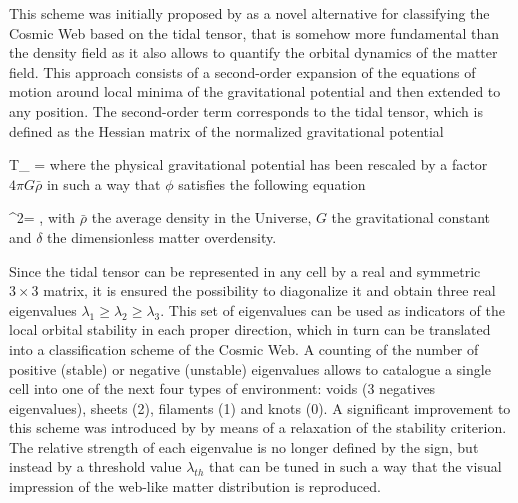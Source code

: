 \documentclass[a4,useAMS,usenatbib,usegraphicx]{latex/mn2e}
\begin{document}
This scheme was initially proposed by \citet{Hahn07} as a novel 
alternative for classifying the Cosmic Web based on the tidal tensor, 
that is somehow more fundamental than the density field as it also allows 
to quantify the orbital dynamics of the matter field. This approach 
consists of a second-order expansion of the equations of motion around 
local minima of the gravitational potential and then extended to any 
position. The second-order term corresponds to the tidal tensor, which is
defined as the Hessian matrix of the normalized gravitational potential


{	T_{\alpha\beta} = 	}
where the physical gravitational potential has been rescaled by a factor 
$4\pi G\bar{\rho}$ in such a way that $\phi$ satisfies the following 
equation


{	\nabla^2\phi = \delta,	}
with $\bar{\rho}$ the average density in the Universe, $G$ the 
gravitational constant and $\delta$ the dimensionless matter overdensity.


Since the tidal tensor can be represented in any cell by a real and 
symmetric $3\times 3$ matrix, it is ensured the possibility to diagonalize 
it and obtain three real eigenvalues $\lambda_{1}\geq\lambda_{2}\geq
\lambda_3$. This set of eigenvalues can be used as indicators of the local 
orbital stability in each proper direction, which in turn can be 
translated into a classification scheme of the Cosmic Web. A counting of 
the number of positive (stable) or negative (unstable) eigenvalues allows 
to catalogue a single cell into one of the next four types of environment: 
voids (3 negatives eigenvalues), sheets (2), filaments (1) and knots (0). 
A significant improvement to this scheme was introduced by \citet{Forero09}
by means of a relaxation of the stability criterion. The relative strength 
of each eigenvalue is no longer defined by the sign, but instead by a
threshold value $\lambda_{th}$ that can be tuned in such a way that the
visual impression of the web-like matter distribution is reproduced.



\end{document}

